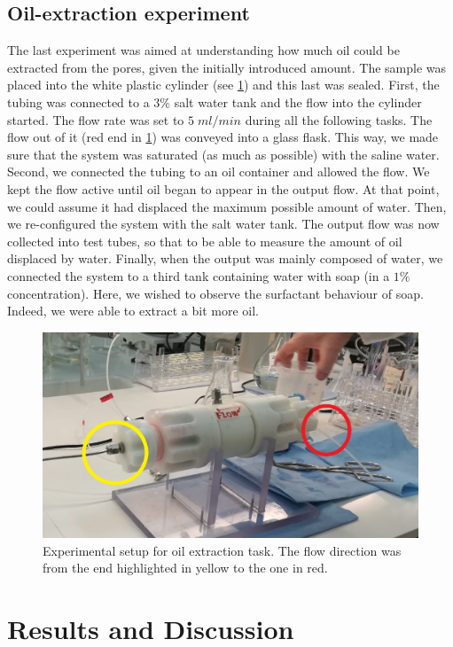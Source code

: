 \documentclass[10pt, a4paper]{amsart}
\begin{document}
\subsection{Oil-extraction experiment}
The last experiment was aimed at understanding how much oil could be extracted from the pores, given the initially introduced amount. The sample was placed into the white plastic cylinder (see \cref{f:lastexp}) and this last was sealed. First, the tubing was connected to a $3\%$ salt water tank and the flow into the cylinder started. The flow rate was set to $5\;ml/min$ during all the following tasks. The flow out of it (red end in \cref{f:lastexp}) was conveyed into a glass flask. This way, we made sure that the system was saturated (as much as possible) with the saline water. Second, we connected the tubing to an oil container and allowed the flow. We kept the flow active until oil began to appear in the output flow. At that point, we could assume it had displaced the maximum possible amount of water. Then, we re-configured the system with the salt water tank. The output flow was now collected into test tubes, so that to be able to measure the amount of oil displaced by water. Finally, when the output was mainly composed of water, we connected the system to a third tank containing water with soap (in a $1\%$ concentration). Here, we wished to observe the surfactant behaviour of soap. Indeed, we were able to extract a bit more oil.

\begin{figure}[H]
    \centering
    \includegraphics[width=\textwidth]{lastexp.jpeg}
    \caption{Experimental setup for oil extraction task. The flow direction was from the end highlighted in yellow to the one in red.}
    \label{f:lastexp}
\end{figure}

\section{Results and Discussion}\label{sec:resdisc}
\end{document}
